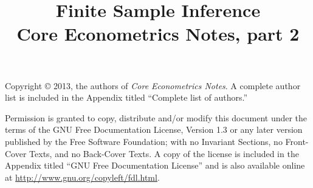 \documentclass[nohyper]{tufte-handout}
\title[Finite Sample Inference]%
{Finite Sample Inference \\
  Core Econometrics Notes, part 2}
\begin{document}
\maketitle

\bigskip\noindent%
Copyright © 2013, the authors of \textit{Core Econometrics Notes}.  A
complete author list is included in the Appendix titled ``Complete
list of authors.''

Permission is granted to copy, distribute and/or modify this document
under the terms of the GNU Free Documentation License, Version 1.3 or
any later version published by the Free Software Foundation; with no
Invariant Sections, no Front-Cover Texts, and no Back-Cover Texts.  A
copy of the license is included in the Appendix titled ``GNU Free
Documentation License'' and is also available online at
\url{http://www.gnu.org/copyleft/fdl.html}.

\tableofcontents















\end{document}
